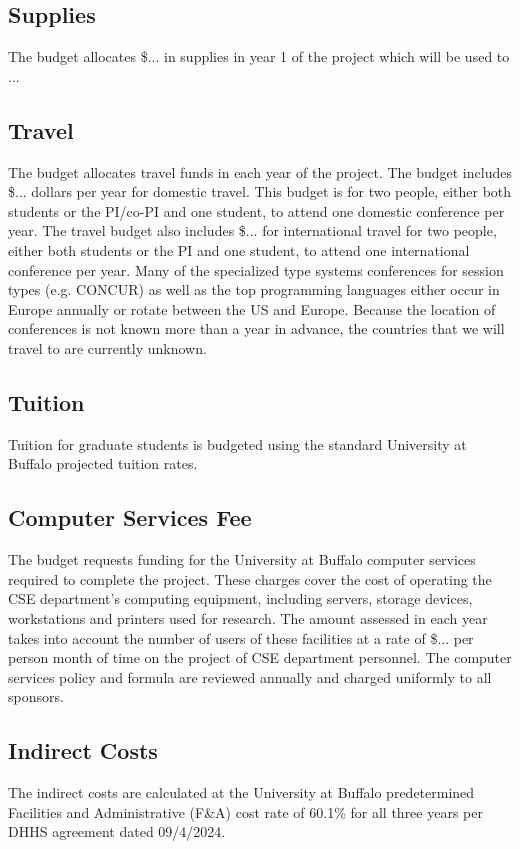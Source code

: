 \subsection*{Supplies}
The budget allocates \$... in supplies in year 1 of the project which will be used to ...

\subsection*{Travel}
The budget allocates travel funds in each year of the project. 
The budget includes \$... dollars per year for domestic travel.
This budget is for two people, either both students or the PI/co-PI and one student, to attend one domestic conference per year.
The travel budget also includes \$... for international travel for two people, either both students or the PI and one student, to attend one international conference per year.
Many of the specialized type systems conferences for session types (e.g. CONCUR) as well as the top programming languages either occur in Europe annually or rotate between the US and Europe.  
Because the location of conferences is not known more than a year in advance, the countries that we will travel to are currently unknown.

\subsection*{Tuition}
Tuition for graduate students is budgeted using the standard University at Buffalo projected tuition rates.

\subsection*{Computer Services Fee}
The budget requests funding for the University at Buffalo computer services required to complete the project.
These charges cover the cost of operating the CSE department's computing equipment, including servers, storage devices, workstations and printers used for research.
The amount assessed in each year takes into account the number of users of these facilities at a rate of \$... per person month of time on the project of CSE department personnel.
The computer services policy and formula are reviewed annually and charged uniformly to all sponsors. 

\subsection*{Indirect Costs}

The indirect costs are calculated at the University at Buffalo predetermined Facilities and Administrative (F\&A) cost rate of  60.1\% for all three years per DHHS agreement dated 09/4/2024.




